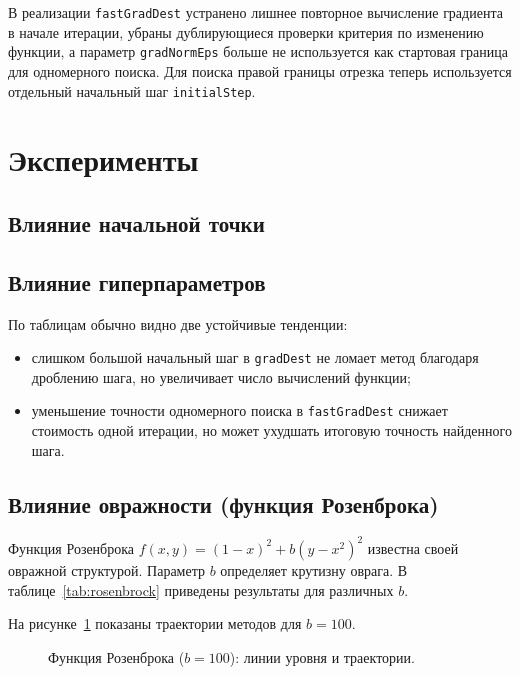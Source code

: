 \documentclass[12pt,a4paper]{article}
\begin{document}
В реализации \texttt{fastGradDest} устранено лишнее повторное вычисление градиента в начале итерации, убраны дублирующиеся проверки критерия по изменению функции, а параметр \texttt{gradNormEps} больше не используется как стартовая граница для одномерного поиска. Для поиска правой границы отрезка теперь используется отдельный начальный шаг \texttt{initialStep}.

\section{Эксперименты}
\subsection{Влияние начальной точки}


\subsection{Влияние гиперпараметров}



По таблицам обычно видно две устойчивые тенденции:
\begin{itemize}
\item слишком большой начальный шаг в \texttt{gradDest} не ломает метод благодаря дроблению шага, но увеличивает число вычислений функции;
\item уменьшение точности одномерного поиска в \texttt{fastGradDest} снижает стоимость одной итерации, но может ухудшать итоговую точность найденного шага.
\end{itemize}

\subsection{Влияние овражности (функция Розенброка)}
Функция Розенброка $f(x,y) = (1-x)^2 + b(y-x^2)^2$ известна своей овражной структурой.
Параметр $b$ определяет крутизну оврага. В таблице~\ref{tab:rosenbrock} приведены результаты для различных $b$.


На рисунке~\ref{fig:rosenbrock} показаны траектории методов для $b=100$.
\begin{figure}[H]
\centering

\caption{Функция Розенброка ($b=100$): линии уровня и траектории.}
\label{fig:rosenbrock}
\end{figure}
\end{document}

